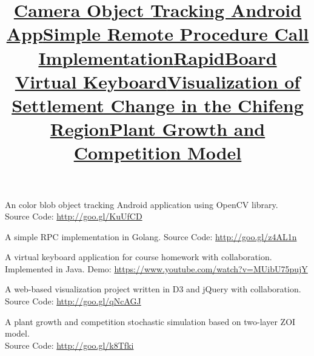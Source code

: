 \begin{resume}
\title{\textbf{\href{https://github.com/adorazhang/AndroidOpenCVTracking}{Camera Object Tracking Android App}}}
\begin{position}
An color blob object tracking Android application using OpenCV library. \\
Source Code: \url{http://goo.gl/KuUfCD}
\end{position}

\title{\textbf{\href{https://github.com/adorazhang/SimpleRPC}{Simple Remote Procedure Call Implementation}}}
\begin{position}
A simple RPC implementation in Golang. Source Code: \url{http://goo.gl/z4AL1n}
\end{position}

\title{\textbf{\href{https://www.youtube.com/watch?v=MUibU75pujY}{RapidBoard Virtual Keyboard}}}
\begin{position}
A virtual keyboard application for course homework with collaboration. Implemented in Java.
Demo: \url{https://www.youtube.com/watch?v=MUibU75pujY}
\end{position}



\title{\textbf{\href{https://github.com/adorazhang/CodeSnippets/tree/master/visualization-project}{Visualization of Settlement Change in the Chifeng Region}}}
\begin{position}
A web-based visualization project written in D3 and jQuery with collaboration. \\Source Code: \url{http://goo.gl/qNcAGJ}
\end{position}


\title{\textbf{\href{https://github.com/adorazhang/CodeSnippets/tree/master/growth-model}{Plant Growth and Competition Model}}}
\begin{position}
 A plant growth and competition stochastic simulation based on two-layer ZOI model. \\Source Code: \url{http://goo.gl/k8Tfki}
\end{position}

%


\end{resume}
